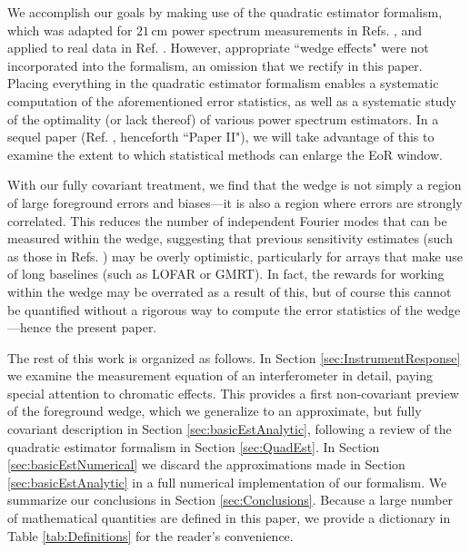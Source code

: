 \documentclass[twocolumn,aps,prd,nofootinbib,showpacs]{revtex4-1}
\begin{document}
We accomplish our goals by making use of the quadratic estimator formalism, which was adapted for $21\,\textrm{cm}$ power spectrum measurements in Refs. \cite{Liu2011,Dillon2013}, and applied to real data in Ref. \cite{Dillon2014}.  However, appropriate ``wedge effects" were not incorporated into the formalism, an omission that we rectify in this paper.  Placing everything in the quadratic estimator formalism enables a systematic computation of the aforementioned error statistics, as well as a systematic study of the optimality (or lack thereof) of various power spectrum estimators.  In a sequel paper (Ref. \cite{Liu2014b}, henceforth ``Paper II"), we will take advantage of this to examine the extent to which statistical methods can enlarge the EoR window.

With our fully covariant treatment, we find that the wedge is not simply a region of large foreground errors and biases---it is also a region where errors are strongly correlated.  This reduces the number of independent Fourier modes that can be measured within the wedge, suggesting that previous sensitivity estimates (such as those in Refs. \cite{Parsons2012a,Beardsley2013,Pober2014}) may be overly optimistic, particularly for arrays that make use of long baselines (such as LOFAR or GMRT).  In fact, the rewards for working within the wedge may be overrated as a result of this, but of course this cannot be quantified without a rigorous way to compute the error statistics of the wedge---hence the present paper.

The rest of this work is organized as follows.  In Section \ref{sec:InstrumentResponse} we examine the measurement equation of an interferometer in detail, paying special attention to chromatic effects.  This provides a first non-covariant preview of the foreground wedge, which we generalize to an approximate, but fully covariant description in Section \ref{sec:basicEstAnalytic}, following a review of the quadratic estimator formalism in Section \ref{sec:QuadEst}.  In Section \ref{sec:basicEstNumerical} we discard the approximations made in Section \ref{sec:basicEstAnalytic} in a full numerical implementation of our formalism.  We summarize our conclusions in Section \ref{sec:Conclusions}.  Because a large number of mathematical quantities are defined in this paper, we provide a dictionary in Table \ref{tab:Definitions} for the reader's convenience.
\end{document}
